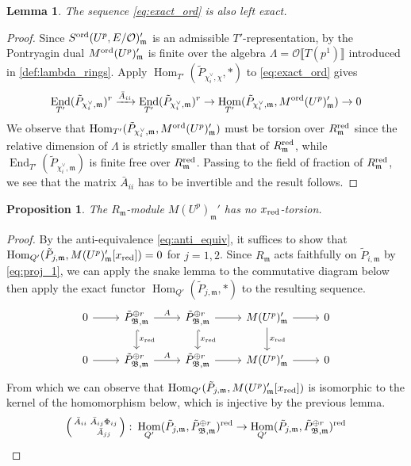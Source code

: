 \documentclass[leqno]{amsart}
\newtheorem{lem}[thm]{Lemma}
\newtheorem{prop}[thm]{Proposition}
\theoremstyle{definition}
\theoremstyle{remark}
\newcommand{\smat}[1]{\left(\begin{smallmatrix} #1 \end{smallmatrix}\right)}
\newcommand{\oo}{\mathcal{O}}
\DeclareMathOperator{\End}{End}
\DeclareMathOperator{\Hom}{Hom}
\newcommand{\fm}{\mathfrak{m}}
\newcommand{\B}{\mathfrak B} %
\newcommand{\red}{\textnormal{red}}
\newcommand{\xx}{x_\textnormal{red}}
\newcommand{\ord}{\textnormal{ord}} %
\begin{document}
\begin{lem}    
The sequence \eqref{eq:exact_ord}
is also left exact.
\end{lem}
\begin{proof}
    Since $S^{\ord}(U^p,E/\oo)_\fm'$
    is an admissible $T'$-representation,
	by \cite[Lem 2.2.11]{emeI}
    the Pontryagin dual $M^{\ord}(U^p)_\fm'$
    is finite over the algebra
    $\Lambda=\oo\llbracket T(p^1)\rrbracket$
    introduced in \eqref{def:lambda_rings}.
	Apply $\Hom_{T'}(\tilde{P}_{\chi_i^\vee,\chi},*)$
	to \eqref{eq:exact_ord} gives
\begin{equation*}
	\End_{T'}(\tilde{P}_{\chi_i^\vee,\fm})^r\xrightarrow{\bar{A}_{ii}}
	\End_{T'}(\tilde{P}_{\chi_i^\vee,\fm})^r\to 
	\Hom_{T'}(\tilde{P}_{\chi_i^\vee,\fm}, M^{\ord}(U^p)_\fm')
	\to 0
\end{equation*}
    We observe that 
    $\Hom_{T'}(\tilde{P}_{\chi_i^\vee,\fm}, M^{\ord}(U^p)_\fm')$
    must be torsion over $R_{\fm}^\red$
    since the relative dimension of $\Lambda$ is
	strictly smaller than that of $R_{\fm}^{\red}$,
    while $\End_{T'}(\tilde{P}_{\chi_i^\vee,\fm})$
	is finite free over $R_{\fm}^{\red}$.
	Passing to the field of fraction of $R_{\fm}^{\red}$,
	we see that the matrix $\bar{A}_{ii}$ has to be invertible
	and the result follows.
\end{proof}
\begin{prop}\label{prop:no_torsion}
    The $R_\fm$-module $M(U^p)_{\fm}'$
    has no $\xx$-torsion.
\end{prop}
\begin{proof}
    By the anti-equivalence \eqref{eq:anti_equiv},
	it suffices to show that
	$\Hom_{Q'}(\tilde{P}_{j,\fm}, M(U^p)_{\fm}'[\xx])=0$
	for $j=1,2$.
    Since $R_\fm$ acts faithfully on $\tilde{P}_{i,\fm}$
    by \eqref{eq:proj_1}, 
	we can apply the snake lemma to the commutative diagram
    below then apply the exact functor
    $\Hom_{Q'}(\tilde{P}_{j,\fm}, *)$
    to the resulting sequence.
    \begin{equation*}
    \begin{tikzcd}
    0 \arrow[r] & 
    \tilde{P}_{\B,\fm}^{\oplus r} 
	\arrow[d,"\xx",hookrightarrow] \arrow[r,"A"] & 
	\tilde{P}_{\B,\fm}^{\oplus r} 
	\arrow[d,"\xx",hookrightarrow] \arrow[r] & 
	M(U^p)_{\fm}'
    \arrow[d,"\xx"]  \arrow[r] & 0 \\ 
    0 \arrow[r] & 
    \tilde{P}_{\B,\fm}^{\oplus r}
	\arrow[r,"A"] & 
    \tilde{P}_{\B,\fm}^{\oplus r}
	\arrow[r] &
    M(U^p)_{\fm}'  
    \arrow[r] & 0 
    \end{tikzcd}
\end{equation*}
From which we can observe that
$\Hom_{Q'}(\tilde{P}_{j,\fm}, M(U^p)_{\fm}'[\xx])$
is isomorphic to the kernel of the homomorphism below,
which is injective by the previous lemma.
\begin{equation}\label{eq:fil_ij}
	\smat{\bar{A}_{ii}& \bar{A}_{ij}\Phi_{ij}\\& \bar{A}_{jj}}\colon 
	\Hom_{Q'}(\tilde{P}_{j,\fm},\tilde{P}_{\B,\fm}^{\oplus r})^{\red}\to
	\Hom_{Q'}(\tilde{P}_{j,\fm},\tilde{P}_{\B,\fm}^{\oplus r})^{\red}
\end{equation}
\end{proof}
\end{document}
